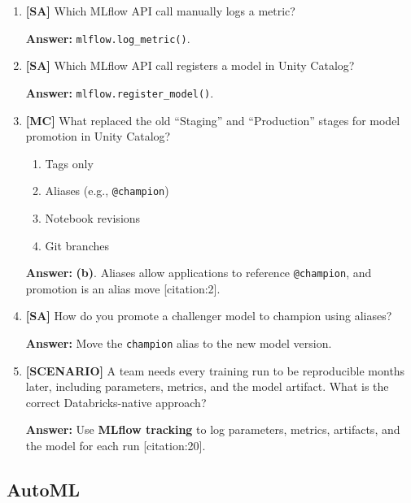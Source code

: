 \documentclass[11pt]{article}
\begin{document}
	\begin{enumerate}[leftmargin=*, label=\textbf{Q\arabic*.}, start=8]
		
		\item \textbf{[SA]} Which MLflow API call manually logs a metric?
		
		\textbf{Answer:} \texttt{mlflow.log\_metric()}.
		
		\item \textbf{[SA]} Which MLflow API call registers a model in Unity Catalog?
		
		\textbf{Answer:} \texttt{mlflow.register\_model()}.
		
		\item \textbf{[MC]} What replaced the old ``Staging'' and ``Production'' stages for model promotion in Unity Catalog?
		\begin{enumerate}[label=(\alph*)]
			\item Tags only
			\item Aliases (e.g., \texttt{@champion})
			\item Notebook revisions
			\item Git branches
		\end{enumerate}
		
		\textbf{Answer:} \textbf{(b)}. Aliases allow applications to reference \texttt{@champion}, and promotion is an alias move [citation:2].
		
		\item \textbf{[SA]} How do you promote a challenger model to champion using aliases?
		
		\textbf{Answer:} Move the \texttt{champion} alias to the new model version.
		
		\item \textbf{[SCENARIO]} A team needs every training run to be reproducible months later, including parameters, metrics, and the model artifact. What is the correct Databricks-native approach?
		
		\textbf{Answer:} Use \textbf{MLflow tracking} to log parameters, metrics, artifacts, and the model for each run [citation:20].
		
	\end{enumerate}
	
	\subsection*{AutoML}
	
\end{document}
